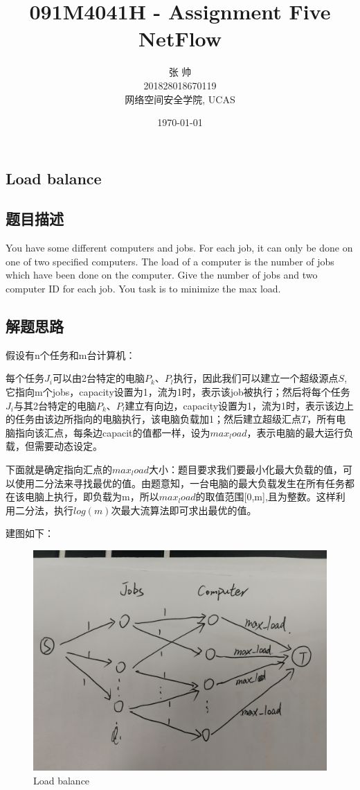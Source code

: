 \documentclass[UTF8,a4paper,12pt]{article}
\title{091M4041H - Assignment Five\\NetFlow}
\date{\today}
\author{张   帅\\201828018670119\\网络空间安全学院, UCAS}
\begin{document}
	\begin{CJK}{UTF8}{gkai}
		\maketitle
		
	\newpage
	\section{Load balance}
	\subsection{题目描述}
		You have some different computers and jobs. For each job, it can only be done on one of two specified computers. The load of a computer is the number of jobs which have been done on the computer. Give the number of jobs and two computer ID for each job. You task is to minimize the max load.
	\subsection{解题思路}	
	
		假设有n个任务和m台计算机：
		
		每个任务$ J_i $可以由2台特定的电脑$ P_k、P_l $执行，因此我们可以建立一个超级源点$ S $,它指向m个jobs，capacity设置为1，流为1时，表示该job被执行；然后将每个任务$ J_i $与其2台特定的电脑$ P_k、P_l $建立有向边，capacity设置为1，流为1时，表示该边上的任务由该边所指向的电脑执行，该电脑负载加1；然后建立超级汇点$ T $，所有电脑指向该汇点，每条边capacit的值都一样，设为$ max_load $，表示电脑的最大运行负载，但需要动态设定。
		
		下面就是确定指向汇点的$ max_load $大小：题目要求我们要最小化最大负载的值，可以使用二分法来寻找最优的值。由题意知，一台电脑的最大负载发生在所有任务都在该电脑上执行，即负载为m，所以$ max_load $的取值范围[0,m],且为整数。这样利用二分法，执行$ log(m) $次最大流算法即可求出最优的值。
		
		建图如下：

	\begin{figure}[htb]
	\centering
	\includegraphics[scale=.1]{./1.jpg}
	\caption{Load balance}
\end{figure}
	

\end{CJK}
\end{document}
